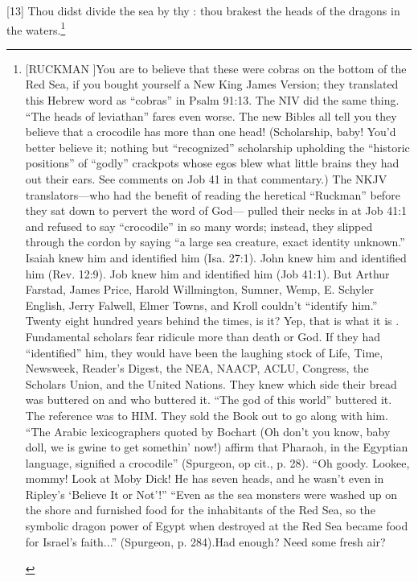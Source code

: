 [13] \textcolor[rgb]{0.00,0.00,1.00}{Thou didst divide the sea by thy : thou brakest the heads of the dragons in the waters.}\footnote{[RUCKMAN ]You are to believe that these were cobras on the bottom of the Red Sea, if you bought yourself a New King James Version; they translated this Hebrew word as “cobras” in Psalm 91:13. The NIV did the same thing. “The heads of leviathan” fares even worse. The new Bibles all tell you they believe that a crocodile has more than one head! (Scholarship, baby! You’d better believe it; nothing but “recognized” scholarship upholding the “historic positions” of “godly” crackpots whose egos blew what little brains they had out their ears. See comments on Job 41 in that commentary.) The NKJV translators—who had the benefit of reading the heretical “Ruckman” before they sat down to pervert the word of God— pulled their necks in at Job 41:1 and refused to say “crocodile” in so many words; instead, they slipped through the cordon by saying “a large sea creature, exact identity unknown.” Isaiah knew him and identified him (Isa. 27:1). John knew him and identified him (Rev. 12:9). Job knew him and identified him (Job 41:1). But Arthur Farstad, James Price, Harold Willmington, Sumner, Wemp, E. Schyler English, Jerry Falwell, Elmer Towns, and Kroll couldn’t “identify him.” Twenty eight hundred years behind the times, is it? Yep, that is what it is . Fundamental scholars fear ridicule more than death or God. If they had “identified” him, they would have been the laughing stock of Life, Time, Newsweek, Reader’s Digest, the NEA, NAACP, ACLU, Congress, the Scholars Union, and the United Nations. They knew which side their bread was buttered on and who buttered it. “The god of this world” buttered it. The reference was to HIM. They sold the Book out to go along with him. “The Arabic lexicographers quoted by Bochart (Oh don’t you know, baby doll, we is gwine to get somethin’ now!) affirm that Pharaoh, in the Egyptian language, signified a crocodile” (Spurgeon, op cit., p. 28). “Oh goody. Lookee, mommy! Look at Moby Dick! He has seven heads, and he wasn’t even in Ripley’s ‘Believe It or Not’!” “Even as the sea monsters were washed up on the shore and furnished food for the inhabitants of the Red Sea, so the symbolic dragon power of Egypt when destroyed at the Red Sea became food for Israel’s faith...” (Spurgeon, p. 284).Had enough? Need some fresh air? \begin{compactenum}

\end{compactenum}}
